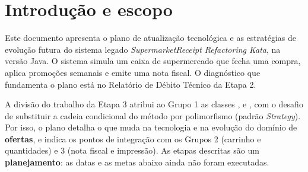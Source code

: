 

\tableofcontents\newpage

\section{Introdu\c{c}\~ao e escopo}
Este documento apresenta o plano de atualiza\c{c}\~ao tecnol\'ogica e as estrat\'egias de evolu\c{c}\~ao futura do sistema legado \textit{SupermarketReceipt Refactoring Kata}, na vers\~ao Java. O sistema simula um caixa de supermercado que fecha uma compra, aplica promo\c{c}\~oes semanais e emite uma nota fiscal. O diagn\'ostico que fundamenta o plano est\'a no Relat\'orio de D\'ebito T\'ecnico da Etapa 2.

A divis\~ao do trabalho da Etapa 3 atribui ao Grupo 1 as classes ,  e , com o desafio de substituir a cadeia condicional do m\'etodo  por polimorfismo (padr\~ao \textit{Strategy}). Por isso, o plano detalha o que muda na tecnologia e na evolu\c{c}\~ao do dom\'inio de \textbf{ofertas}, e indica os pontos de integra\c{c}\~ao com os Grupos 2 (carrinho e quantidades) e 3 (nota fiscal e impress\~ao). As etapas descritas s\~ao um \textbf{planejamento}: as datas e as metas abaixo ainda n\~ao foram executadas.

